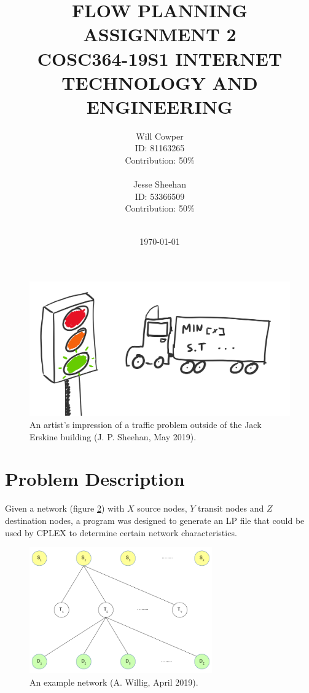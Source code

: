 \documentclass[12pt]{article} %
\title{\uppercase{
	Flow Planning\\
	\large{Assignment 2} \\
	\small{COSC364-19S1 Internet Technology and Engineering}
}}
\date{\today}
\author{
	Will Cowper\\
	{\small{ID: 81163265}}\\
	{\small{Contribution: 50\%}}\\
	\\
	Jesse Sheehan\\
	{\small{ID: 53366509}}\\
	{\small{Contribution: 50\%}}\\
	\\
}
\begin{document}
\maketitle

\begin{figure}[H]
	\centering
	\includegraphics[width=\textwidth]{traffic}
	\caption{An artist's impression of a traffic problem outside of the Jack Erskine building (J. P. Sheehan, May 2019).}
	\label{fig:traffic}
\end{figure}



\section{Problem Description}

Given a network (figure \ref{fig:network}) with $X$ source nodes, $Y$ transit nodes and $Z$ destination nodes, a program was designed to generate an LP file that could be used by CPLEX to determine certain network characteristics.

\begin{figure}[H]
	\centering
	\includegraphics[width=0.7\textwidth]{network}
	\caption{An example network (A. Willig, April 2019).}
	\label{fig:network}
\end{figure}
\end{document}
